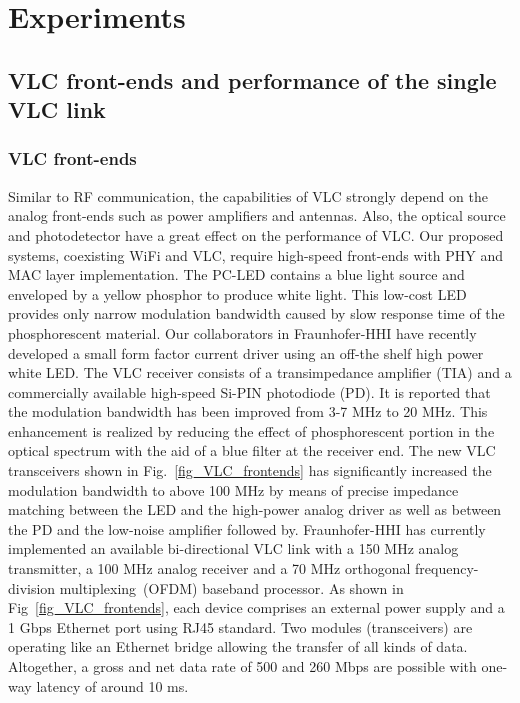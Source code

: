 \documentclass[10pt,journal]{IEEEtran}
\begin{document}
\section{Experiments}\label{sec4}

\subsection{VLC front-ends and performance of the single VLC link}
\subsubsection{VLC front-ends}
Similar to RF communication, the capabilities of VLC strongly depend on the analog front-ends such as power amplifiers and antennas. Also, the optical source and photodetector have a great effect on the performance of VLC. Our proposed systems, coexisting WiFi and VLC, require high-speed front-ends with PHY and MAC layer implementation. The PC-LED contains a blue light source and enveloped by a yellow phosphor to produce white light. This low-cost LED provides only narrow modulation bandwidth caused by slow response time of the phosphorescent material. Our collaborators in Fraunhofer-HHI have recently developed a small form factor current driver using an off-the shelf high power white LED. The VLC receiver consists of a transimpedance amplifier (TIA) and a commercially available high-speed Si-PIN photodiode (PD). It is reported that the modulation bandwidth has been improved from 3-7 MHz to 20 MHz. This enhancement is realized by reducing the effect of phosphorescent portion in the optical spectrum with the aid of a blue filter at the receiver end. The new VLC transceivers shown in Fig.~\ref{fig_VLC_frontends} has significantly increased the modulation bandwidth to above 100 MHz by means of precise impedance matching between the LED and the high-power analog driver as well as between the PD and the low-noise amplifier followed by. Fraunhofer-HHI has currently implemented an available bi-directional VLC link with a 150 MHz analog transmitter, a 100 MHz analog receiver and a 70 MHz orthogonal frequency-division multiplexing~(OFDM) baseband processor. As shown in Fig~\ref{fig_VLC_frontends}, each device comprises an external power supply and a 1 Gbps Ethernet port using RJ45 standard. Two modules (transceivers) are operating like an Ethernet bridge allowing the transfer of all kinds of data. Altogether, a gross and net data rate of 500 and 260 Mbps are possible with one-way latency of around 10 ms.
\end{document}
